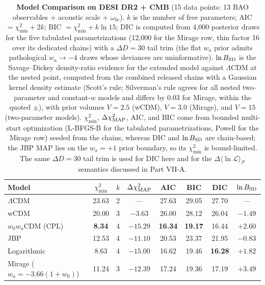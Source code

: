 \documentclass[11pt,letterpaper]{article}
\begin{document}
\begin{table}[!htbp]
    \centering
    \caption{\textbf{Model Comparison on DESI DR2 + CMB} (15 data points: 13 BAO observables + acoustic scale + $\omega_{bc}$). $k$ is the number of free parameters; AIC $= \chi^2_{\min} + 2k$; BIC $= \chi^2_{\min} + k\ln 15$; DIC is computed from 4{,}000 posterior draws for the five tabulated parametrizations (12{,}000 for the Mirage row, thin factor 16 over its dedicated chains) with a $\Delta D = 30$ tail trim (the flat $w_a$ prior admits pathological $w_a \to -4$ draws whose deviances are uninformative). $\ln B_{\rm SD}$ is the Savage--Dickey density-ratio evidence for the extended model against $\Lambda$CDM at the nested point, computed from the combined released chains with a Gaussian kernel density estimate (Scott's rule; Silverman's rule agrees for all nested two-parameter and constant-$w$ models and differs by 0.03 for Mirage, within the quoted $\pm$), with prior volumes $V = 2.5$ (wCDM), $V = 3.0$ (Mirage), and $V = 15$ (two-parameter models). $\chi^2_{\min}$, $\Delta\chi^2_{\rm MAP}$, AIC, and BIC come from bounded multi-start optimization (L-BFGS-B for the tabulated parametrizations, Powell for the Mirage row) seeded from the chains, whereas DIC and $\ln B_{\rm SD}$ are chain-based; the JBP MAP lies on the $w_a = +1$ prior boundary, so its $\chi^2_{\min}$ is bound-limited. The same $\Delta D = 30$ tail trim is used for DIC here and for the $\Delta\langle\ln\mathcal{L}\rangle_{\mathcal{P}}$ semantics discussed in Part VII-A.}
    \label{tab:modelcomp_verification}
    \begin{tabular}{lccccccc}
        \toprule
        Model & $\chi^2_{\min}$ & $k$ & $\Delta\chi^2_{\rm MAP}$ & AIC & BIC & DIC & $\ln B_{\rm SD}$ \\
        \midrule
        $\Lambda$CDM & 23.63 & 2 & --- & 27.63 & 29.05 & 27.70 & --- \\
        wCDM & 20.00 & 3 & $-3.63$ & 26.00 & 28.12 & 26.04 & $-1.49$ \\
        $w_0 w_a$CDM (CPL) & \textbf{8.34} & 4 & $\mathbf{-15.29}$ & \textbf{16.34} & \textbf{19.17} & 16.44 & $\mathbf{+2.60}$ \\
        JBP & 12.53 & 4 & $-11.10$ & 20.53 & 23.37 & 21.95 & $-0.83$ \\
        Logarithmic & 8.63 & 4 & $-15.00$ & 16.62 & 19.46 & \textbf{16.28} & $+1.82$ \\
        Mirage ($w_a = -3.66(1+w_0)$) & 11.24 & 3 & $-12.39$ & 17.24 & 19.36 & 17.19 & $\mathbf{+3.49}$ \\
        \bottomrule
    \end{tabular}
\end{table}
\end{document}
